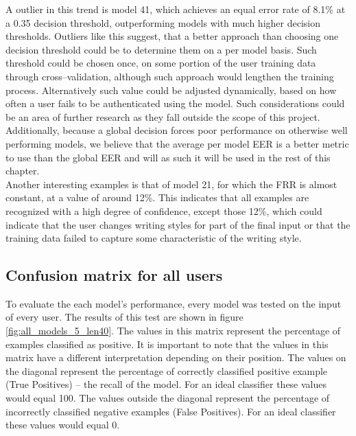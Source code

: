 A outlier in this trend is model 41, which achieves an equal error rate of 8.1\% at a 0.35 decision threshold, outperforming models with much higher decision thresholds. Outliers like this suggest, that a better approach than choosing one decision threshold could be to determine them on a per model basis. Such threshold could be chosen once, on some portion of the user training data through cross--validation, although such approach would lengthen the training process. Alternatively such value could be adjusted dynamically, based on how often a user fails to be authenticated using the model. Such considerations could be an area of further research as they fall outside the scope of this project.\\
Additionally, because a global decision forces poor performance on otherwise well performing models, we believe that the average per model EER is a better metric to use than the global EER and will as such it will be used in the rest of this chapter.\\
Another interesting examples is that of model 21, for which the FRR is almost constant, at a value of around 12\%. This indicates that all examples are recognized with a high degree of confidence, except those 12\%, which could indicate that the user changes writing styles for part of the final input or that the training data failed to capture some characteristic of the writing style.

\subsection{Confusion matrix for all users}
To evaluate the each model's performance, every model was tested on the input of every user. The results of this test are shown in figure \ref{fig:all_models_5_len40}. The values in this matrix represent the percentage of examples classified as positive. It is important to note that the values in this matrix have a different interpretation depending on their position. The values on the diagonal represent the percentage of correctly classified positive example (True Positives) -- the recall of the model. For an ideal classifier these values would equal 100. The values outside the diagonal represent the percentage of incorrectly classified negative examples (False Positives). For an ideal classifier these values would equal 0.

